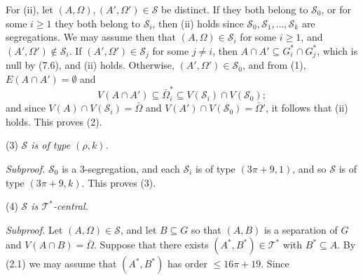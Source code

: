 For (ii), let $(A, \Omega), (A', \Omega') \in \mathscr{S}$ be distinct. If they both belong to $\mathscr{S}_0$, or for some $i \ge 1$ they both belong to $\mathscr{S}_i$, then (ii) holds since $\mathscr{S}_0, \mathscr{S}_1, \dots, \mathscr{S}_k$ are segregations. We may assume then that $(A, \Omega) \in \mathscr{S}_i$ for some $i \ge 1$, and $(A', \Omega') \notin \mathscr{S}_i$. If $(A', \Omega') \in \mathscr{S}_j$ for some $j \neq i$, then $A \cap A' \subseteq G_i^* \cap G_j^*$, which is null by (7.6), and (ii) holds. Otherwise, $(A', \Omega') \in \mathscr{S}_0$, and from (1), $E(A \cap A') = \emptyset$ and
\begin{equation*}
V(A \cap A') \subseteq \bar{\Omega}_i^* \subseteq V(\mathscr{S}_i) \cap V(\mathscr{S}_0);
\end{equation*}
and since $V(A) \cap V(\mathscr{S}_i) = \bar{\Omega}$ and $V(A') \cap V(\mathscr{S}_0) = \bar{\Omega}'$, it follows that (ii) holds. This proves (2).

\hspace*{12pt}(3) \textit{$\mathscr{S}$ is of type $(\rho, k)$.}

\textit{Subproof.} $\mathscr{S}_0$ is a 3-segregation, and each $\mathscr{S}_i$ is of type $(3\pi + 9, 1)$, and so $\mathscr{S}$ is of type $(3\pi + 9, k)$. This proves (3).

\hspace*{12pt}(4) \textit{$\mathscr{S}$ is $\mathscr{T}^*$-central.}

\textit{Subproof.} Let $(A, \Omega) \in \mathscr{S}$, and let $B \subseteq G$ so that $(A, B)$ is a separation of $G$ and $V(A \cap B) = \bar{\Omega}$. Suppose that there exists $(A^*, B^*) \in \mathscr{T}^*$ with $B^* \subseteq A$. By (2.1) we may assume that $(A^*, B^*)$ has order $\le 16\pi + 19$. Since
